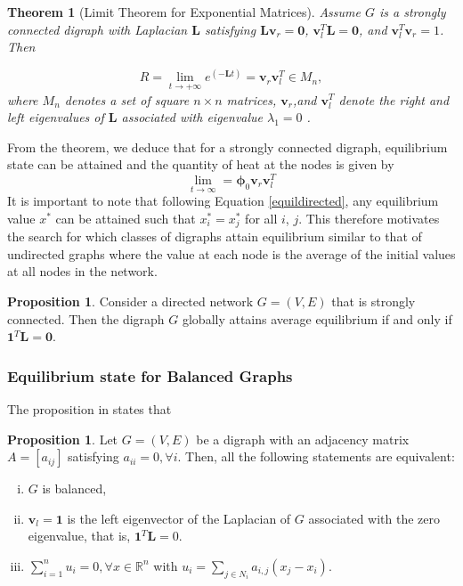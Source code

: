 \documentclass[10pt,a4paper]{article}
\theoremstyle{plain}
\newtheorem{thm}[subsection]{Theorem}
\theoremstyle{definition}
\newtheorem{prop}[subsection]{Proposition}
\begin{document}
        \begin{thm}[Limit Theorem for Exponential Matrices]
        	Assume $G$ is a strongly connected digraph with Laplacian $\mathbf{L}$ satisfying $\mathbf{L} \mathbf{v}_r = \mathbf{0}$, $\mathbf{v}_{l} ^T \mathbf{L} =\mathbf{0}$, and $\mathbf{v}_{l} ^T \mathbf{v}_r=1$. Then 
        	
        	\begin{equation}
        	 R = \lim_{t \longrightarrow +\infty} e^{(-\mathbf{L}t)
        	} = \mathbf{v}_r  \mathbf{v}_{l} ^T \in M_n,
        	\end{equation}
        	where $M_n$ denotes a set of square $n\times n$ matrices, $\mathbf{v}_r$,and $\mathbf{v}_{l} ^T$ denote the right and left eigenvalues of $\mathbf{L}$ associated with eigenvalue $\lambda_1 = 0$ \citep{saber2003agreement}.
        	\label{exponentialTheorem}
        \end{thm}
    From the theorem, we deduce that for a strongly connected digraph, equilibrium state can be attained and the quantity of heat at the nodes is given by
    \begin{equation}
    \lim_{t \longrightarrow \infty} =  \boldsymbol{\phi}_0  \mathbf{v}_r  \mathbf{v}_{l} ^T
    \label{equildirected}
    \end{equation}
    It is important to note that following Equation \ref{equildirected}, any equilibrium value $x^*$ can be attained such that $x^*_i =x^*_j$ for all $i$, $j$. This therefore motivates the search for which classes of digraphs attain equilibrium similar to that of undirected graphs where the value at each node is the average of the initial values at all nodes in the network.
    
    \begin{prop}
    Consider a directed network $G=(V,E)$ that is strongly connected. Then the digraph $G$ globally attains average equilibrium if and only if $\mathbf{1}^T \mathbf{L}= \mathbf{0}$.
    \label{prop1}
    \end{prop} 

    \subsubsection{Equilibrium state for Balanced Graphs}
     The proposition in \citep{saber2003agreement} states that 
     \begin{prop}
     Let $G=(V,E)$ be a digraph with an adjacency matrix $A=[a_{ij}]$ satisfying $a_{ii}=0, \forall i$. Then, all the following statements are equivalent:
     \begin{enumerate}[i)]
     	\item $G$ is balanced,
     	\item $\mathbf{v}_l = \mathbf{1}$ is the left eigenvector of the Laplacian of $G$ associated with the zero eigenvalue, that is, $\mathbf{1}^T \mathbf{L} = 0$.
     	\item $\sum_{i=1} ^ n u_i = 0, \forall x \in  \mathbb{R}^n$ with $u_i = \sum_{j \in N_i} a_{i,j} (x_j -x_i).$
     \end{enumerate}
     \label{prop1}
     \end{prop}
 
\end{document}
